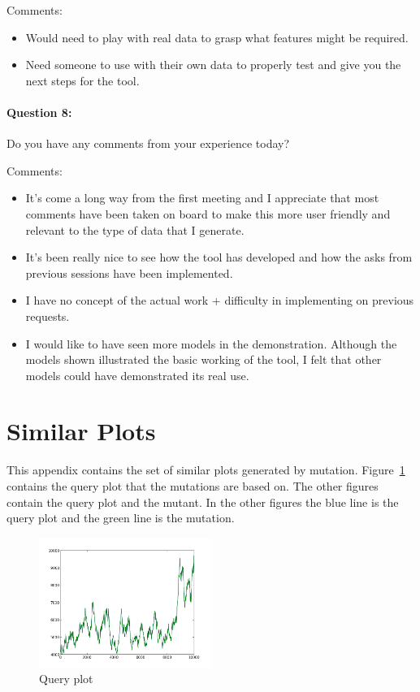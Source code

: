 Comments:
\begin{itemize}
\item Would need to play with real data to grasp what features might be required.
\item Need someone to use with their own data to properly test and give you the next steps for the tool.
\end{itemize}

\paragraph*{Question 8: } Do you have any comments from your experience today?

Comments:
\begin{itemize}
\item It's come a long way from the first meeting and I appreciate that most comments have been taken on board to make this more user friendly and relevant to the type of data that I generate.
\item It's been really nice to see how the tool has developed and how the asks from previous sessions have been implemented.
\item I have no concept of the actual work + difficulty in implementing on previous requests.
\item I would like to have seen more models in the demonstration.  Although the models shown illustrated the basic working of the tool, I felt that other models could have demonstrated its real use.
\end{itemize}

\clearpage

\section{Similar Plots}
\label{sec:mutants}

This appendix contains the set of similar plots generated by mutation.  Figure~\ref{fig:query} contains the query plot that the mutations are based on.  The other figures contain the query plot and the mutant.  In the other figures the blue line is the query plot and the green line is the mutation.

\begin{figure}[h!]
    \centering
    \includegraphics[width=0.5\textwidth]{images/query.png}
    \caption{Query plot}
    \label{fig:query}
\end{figure}

